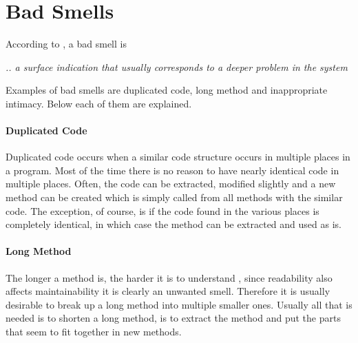 \section{Bad Smells}
According to \citet{code:smell}, a bad smell is 
\begin{center}
\textit{.. a surface indication that usually corresponds to a deeper problem in the system}
\end{center}

Examples of bad smells are duplicated code, long method and inappropriate intimacy. Below each of them are explained. 

\paragraph{Duplicated Code}
Duplicated code occurs when a similar code structure occurs in multiple places in a program. Most of the time there is no reason to have nearly identical code in multiple places. Often, the code can be extracted, modified slightly and a new method can be created which is simply called from all methods with the similar code. The exception, of course, is if the code found in the various places is completely identical, in which case the method can be extracted and used as is.
\paragraph{Long Method}
The longer a method is, the harder it is to understand \citet[p. 64]{fowler:refac}, since readability also affects maintainability it is clearly an unwanted smell. Therefore it is usually desirable to break up a long method into multiple smaller ones. Usually all that is needed is to shorten a long method, is to extract the method and put the parts that seem to fit together in new methods.


